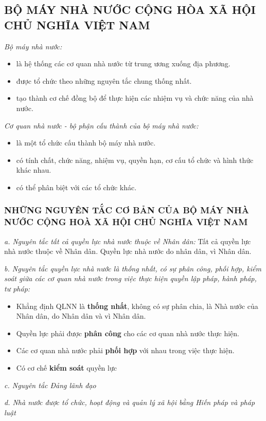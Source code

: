 \documentclass[12pt, a4paper]{article}
\begin{document}
\subsection{BỘ MÁY NHÀ NƯỚC CỘNG HÒA XÃ HỘI CHỦ NGHĨA VIỆT NAM}
\noindent\textit{Bộ máy nhà nước:}
\begin{itemize}
  \item là hệ thống các cơ quan nhà nước từ trung ương xuống địa phương.
  \item được tổ chức theo những nguyên tắc chung thống nhất.
  \item tạo thành cơ chế đồng bộ để thực hiện các nhiệm vụ và chức năng của nhà nước.
\end{itemize}
\textit{Cơ quan nhà nước - bộ phận cấu thành của bộ máy nhà nước:}
\begin{itemize}
  \item là một tổ chức cấu thành bộ máy nhà nước.
  \item có tính chất, chức năng, nhiệm vụ, quyền hạn, cơ cấu tổ chức và hình thức khác nhau.
  \item có thể phân biệt với các tổ chức khác.
\end{itemize}
\subsubsection{NHỮNG NGUYÊN TẮC CƠ BẢN CỦA BỘ MÁY NHÀ NƯỚC CỘNG HOÀ XÃ HỘI CHỦ NGHĨA VIỆT NAM}
\textit{a. Nguyên tắc tất cả quyền lực nhà nước thuộc về Nhân dân:} Tất cả quyền lực nhà nước thuộc về Nhân dân. Quyền lực nhà nước do nhân dân, vì Nhân dân.

\textit{b. Nguyên tắc quyền lực nhà nước là thống nhất, có sự phân công, phối hợp, kiểm soát giữa các cơ quan nhà nước trong việc thực hiện quyền lập pháp, hành pháp, tư pháp:}
\begin{itemize}
  \item Khẳng định QLNN là \textbf{thống nhất}, không có sự phân chia, là Nhà nước của Nhân dân, do Nhân dân và vì Nhân dân.
  \item Quyền lực phải được \textbf{phân công} cho các cơ quan nhà nước thực hiện. 
  \item Các cơ quan nhà nước phải \textbf{phối hợp} với nhau trong việc thực hiện.
  \item Có cơ chế \textbf{kiểm soát} quyền lực
\end{itemize} 

\textit{c. Nguyên tắc Đảng lãnh đạo}

\textit{d. Nhà nước được tổ chức, hoạt động và quản lý xã hội bằng Hiến pháp và pháp luật}
\end{document}
